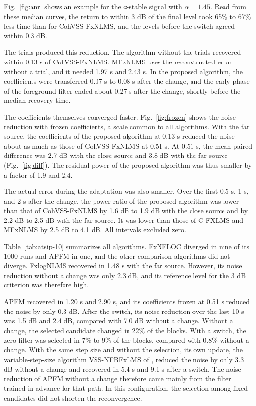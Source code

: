 \documentclass[sip,biber]{now-journal}
\begin{document}
Fig.~\ref{fig:anr} shows an example for the α-stable signal with \(\alpha = 1.45\). Read from these median curves, the return to within 3 dB of the final level took 65\% to 67\% less time than for CohVSS-FxNLMS, and the levels before the switch agreed within 0.3 dB.

The trials produced this reduction. The algorithm without the trials recovered within 0.13 s of CohVSS-FxNLMS. MFxNLMS uses the reconstructed error without a trial, and it needed 1.97 s and 2.43 s. In the proposed algorithm, the coefficients were transferred 0.07 s to 0.08 s after the change, and the early phase of the foreground filter ended about 0.27 s after the change, shortly before the median recovery time.

The coefficients themselves converged faster. Fig.~\ref{fig:frozen} shows the noise reduction with frozen coefficients, a scale common to all algorithms. With the far source, the coefficients of the proposed algorithm at 0.13 s reduced the noise about as much as those of CohVSS-FxNLMS at 0.51 s. At 0.51 s, the mean paired difference was 2.7 dB with the close source and 3.8 dB with the far source (Fig.~\ref{fig:diff}). The residual power of the proposed algorithm was thus smaller by a factor of 1.9 and 2.4.

The actual error during the adaptation was also smaller. Over the first 0.5 s, 1 s, and 2 s after the change, the power ratio of the proposed algorithm was lower than that of CohVSS-FxNLMS by 1.6 dB to 1.9 dB with the close source and by 2.2 dB to 2.5 dB with the far source. It was lower than those of C-FXLMS and MFxNLMS by 2.5 dB to 4.1 dB. All intervals excluded zero.

Table~\ref{tab:atsip-10} summarizes all algorithms. FxNFLOC diverged in nine of its 1000 runs and APFM in one, and the other comparison algorithms did not diverge. FxlogNLMS recovered in 1.48 s with the far source. However, its noise reduction without a change was only 2.3 dB, and its reference level for the 3 dB criterion was therefore high.

APFM recovered in 1.20 s and 2.90 s, and its coefficients frozen at 0.51 s reduced the noise by only 0.3 dB. After the switch, its noise reduction over the last 10 s was 1.5 dB and 2.4 dB, compared with 7.0 dB without a change. Without a change, the selected candidate changed in 22\% of the blocks. With a switch, the zero filter was selected in 7\% to 9\% of the blocks, compared with 0.8\% without a change. With the same step size and without the selection, its own update, the variable-step-size algorithm VSS-NFBFxLMS of \cite{yin2023}, reduced the noise by only 3.3 dB without a change and recovered in 5.4 s and 9.1 s after a switch. The noise reduction of APFM without a change therefore came mainly from the filter trained in advance for that path. In this configuration, the selection among fixed candidates did not shorten the reconvergence.
\end{document}
